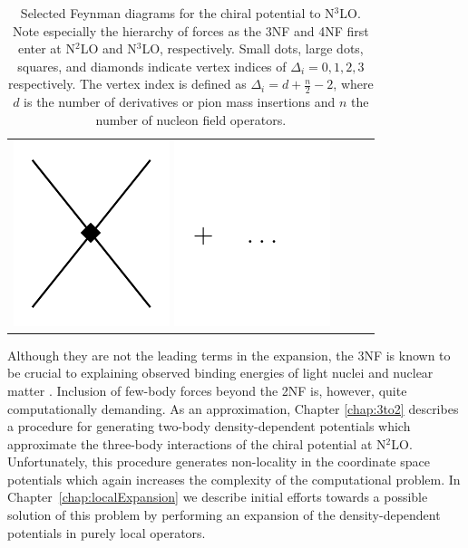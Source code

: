 \begin{table}
\begin{tabular}{ c | c | c | c }
{\includegraphics[scale=0.55,page=10]{Introduction/Figures/N3LO}
\includegraphics[scale=0.55,page=1]{Introduction/Figures/ellipsis} 
} \\
\end{tabular}
\caption[Selected Feynman diagrams for the chiral potential to N$^3$LO.]{\label{fig:chiralPotentialDiagrams} Selected Feynman diagrams for the chiral potential to N$^3$LO. Note especially the hierarchy of forces as the 3NF and 4NF first enter at N$^2$LO and N$^3$LO, respectively. Small dots, large dots, squares, and diamonds indicate vertex indices of $\Delta_i = 0,1,2,3$ respectively. The vertex index is defined as $\Delta_i=d+\tfrac{n}{2}-2$, where $d$ is the number of derivatives or pion mass insertions and $n$ the number of nucleon field operators.}
\end{table}

Although they are not the leading terms in the expansion, the 3NF is known to be crucial to explaining observed binding energies of light nuclei \cite{ABNCSM,PhysRevC.87.014327, PhysRevLett.99.042501,0954-3899-39-8-085111} and nuclear matter \cite{Krewald2012322,PhysRevC.82.014314}. Inclusion of few-body forces beyond the 2NF is, however, quite computationally demanding. As an approximation, Chapter \ref{chap:3to2} describes a procedure for generating two-body density-dependent potentials which approximate the three-body interactions of the chiral potential at N$^2$LO. Unfortunately, this procedure generates non-locality in the coordinate space potentials which again increases the complexity of the computational problem. In Chapter~\ref{chap:localExpansion} we describe initial efforts towards a possible solution of this problem by performing an expansion of the density-dependent potentials in purely local operators.

